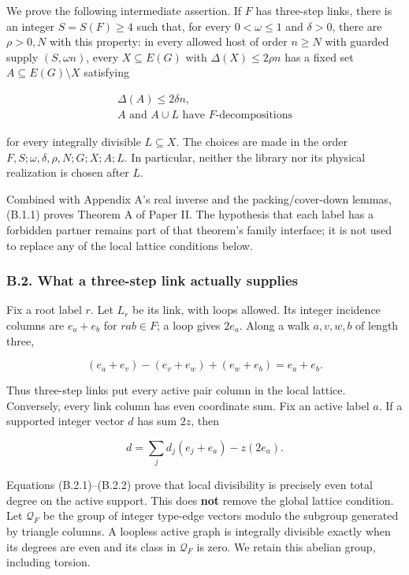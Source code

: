 \documentclass[english,11pt,a4paper]{article}
\begin{document}
We prove the following intermediate assertion. If \(F\) has three-step links, there is an integer \(S=S(F)\ge4\) such that, for every \(0<\omega\le1\) and \(\delta>0\), there are \(\rho>0,N\) with this property: in every allowed host of order \(n\ge N\) with guarded supply \((S,\omega n)\), every \(X\subseteq E(G)\) with \(\Delta(X)\le2\rho n\) has a fixed set \(A\subseteq E(G)\setminus X\) satisfying

\[\begin{gathered}
\Delta(A)\le2\delta n,\\
A\text{ and }A\cup L\text{ have }F\text{-decompositions}
\end{gathered}
\tag{B.1.1}\]

for every integrally divisible \(L\subseteq X\). The choices are made in the order \(F,S;\omega,\delta,\rho,N;G;X;A;L\). In particular, neither the library nor its physical realization is chosen after \(L\).

Combined with Appendix A's real inverse and the packing/cover-down lemmas, (B.1.1) proves Theorem A of Paper II. The hypothesis that each label has a forbidden partner remains part of that theorem's family interface; it is not used to replace any of the local lattice conditions below.

\subsubsection{B.2. What a three-step link actually supplies}\label{b.2.-what-a-three-step-link-actually-supplies}

Fix a root label \(r\). Let \(L_r\) be its link, with loops allowed. Its integer incidence columns are \(e_a+e_b\) for \(rab\in F\); a loop gives \(2e_a\). Along a walk \(a,v,w,b\) of length three,

\[(e_a+e_v)-(e_v+e_w)+(e_w+e_b)=e_a+e_b.
\tag{B.2.1}\]

Thus three-step links put every active pair column in the local lattice. Conversely, every link column has even coordinate sum. Fix an active label \(a\). If a supported integer vector \(d\) has sum \(2z\), then

\[d=\sum_jd_j(e_j+e_a)-z(2e_a).
\tag{B.2.2}\]

Equations (B.2.1)--(B.2.2) prove that local divisibility is precisely even total degree on the active support. This does \textbf{not} remove the global lattice condition. Let \(\mathcal Q_F\) be the group of integer type-edge vectors modulo the subgroup generated by triangle columns. A loopless active graph is integrally divisible exactly when its degrees are even and its class in \(\mathcal Q_F\) is zero. We retain this abelian group, including torsion.
\end{document}
